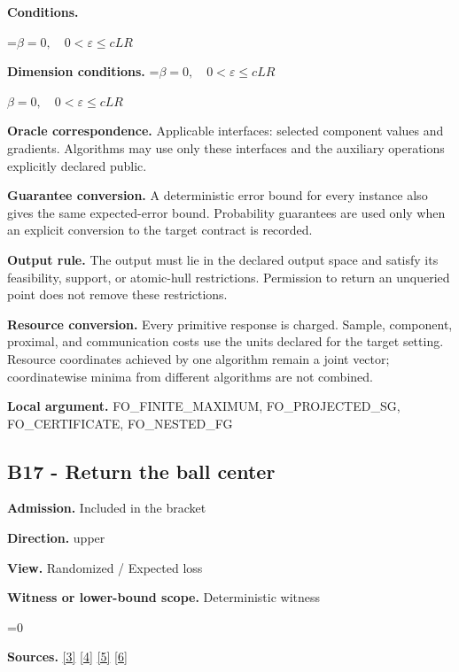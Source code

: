 \documentclass[10pt,a4paper]{article}
\newcommand{\AtlasMath}[1]{\par\begingroup\centering\setbox0=\hbox{$\displaystyle #1$}\ifdim\wd0>1.4\linewidth\typeout{ATLAS WIDE FORMULA: \the\wd0}\fi\ifdim\wd0>\linewidth\resizebox{\linewidth}{!}{\box0}\else\box0\fi\par\endgroup}
\newcommand{\AtlasInlineMath}[1]{\begingroup\setbox0=\hbox{$#1$}\ifdim\wd0>.4\linewidth\endgroup\AtlasMath{#1}\else\endgroup$#1$\fi}
\begin{document}
\textbf{Conditions.}
\AtlasMath{\beta=0,\quad0<\varepsilon\le cLR}




\textbf{Dimension conditions.} \AtlasInlineMath{\beta=0,\quad0<\varepsilon\le cLR}



\textbf{Oracle correspondence.} Applicable interfaces: selected component values and gradients. Algorithms may use only these interfaces and the auxiliary operations explicitly declared public.



\textbf{Guarantee conversion.} A deterministic error bound for every instance also gives the same expected-error bound. Probability guarantees are used only when an explicit conversion to the target contract is recorded.



\textbf{Output rule.} The output must lie in the declared output space and satisfy its feasibility, support, or atomic-hull restrictions. Permission to return an unqueried point does not remove these restrictions.



\textbf{Resource conversion.} Every primitive response is charged. Sample, component, proximal, and communication costs use the units declared for the target setting. Resource coordinates achieved by one algorithm remain a joint vector; coordinatewise minima from different algorithms are not combined.



\textbf{Local argument.} FO\_FINITE\_MAXIMUM, FO\_PROJECTED\_SG, FO\_CERTIFICATE, FO\_NESTED\_FG



\subsection{B17 - Return the ball center}


\textbf{Admission.} Included in the bracket



\textbf{Direction.} upper



\textbf{View.} Randomized / Expected loss



\textbf{Witness or lower-bound scope.} Deterministic witness



\AtlasMath{0}


\textbf{Sources.} \href{https://arxiv.org/pdf/2311.10886}{[3]} \href{https://arxiv.org/pdf/1405.4980}{[4]} \href{https://www2.isye.gatech.edu/~nemirovs/MOR_AccuracyCertificates.pdf}{[5]} \href{https://arxiv.org/pdf/2609.20701}{[6]}
\end{document}
